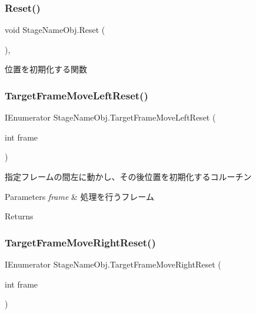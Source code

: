 \subsubsection{\texorpdfstring{Reset()}{Reset()}}
{\footnotesize\ttfamily void Stage\+Name\+Obj.\+Reset (\begin{DoxyParamCaption}{ }\end{DoxyParamCaption})\hspace{0.3cm}{\ttfamily [inline]}, {\ttfamily [private]}}



位置を初期化する関数 

\mbox{\label{class_stage_name_obj_a7dd04a5c3dd0db6836a15c1c508dcecf}} 
\subsubsection{\texorpdfstring{Target\+Frame\+Move\+Left\+Reset()}{TargetFrameMoveLeftReset()}}
{\footnotesize\ttfamily I\+Enumerator Stage\+Name\+Obj.\+Target\+Frame\+Move\+Left\+Reset (\begin{DoxyParamCaption}\item[{int}]{frame }\end{DoxyParamCaption})\hspace{0.3cm}{\ttfamily [inline]}}



指定フレームの間左に動かし、その後位置を初期化するコルーチン 


\begin{DoxyParams}{Parameters}
{\em frame} & 処理を行うフレーム\\
\hline
\end{DoxyParams}
\begin{DoxyReturn}{Returns}

\end{DoxyReturn}
\mbox{\label{class_stage_name_obj_add4c09db609363dcfc655a0182b7bc8b}} 
\subsubsection{\texorpdfstring{Target\+Frame\+Move\+Right\+Reset()}{TargetFrameMoveRightReset()}}
{\footnotesize\ttfamily I\+Enumerator Stage\+Name\+Obj.\+Target\+Frame\+Move\+Right\+Reset (\begin{DoxyParamCaption}\item[{int}]{frame }\end{DoxyParamCaption})\hspace{0.3cm}{\ttfamily [inline]}}



